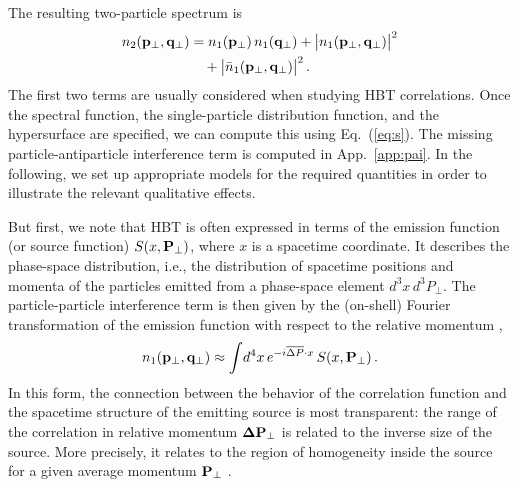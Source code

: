 \documentclass[reprint,superscriptaddress,english,preprintnumbers,amsmath,amssymb,aps,prx]{revtex4-2}
\def\Eq#1{Eq.~(\ref{#1})}
\def\App#1{App.~\ref{#1}}
\begin{document}
The resulting two-particle spectrum is
\begin{align}\label{eq:c2}
\begin{split}
n_2(\bold{p}_\perp,\bold{q}_\perp)
&= n_1(\bold{p}_\perp)\,n_1(\bold{q}_\perp) + \big|n_1(\bold{p}_\perp,\bold{q}_\perp)\big|^2\\
&\quad+ \big|\bar n_1(\bold{p}_\perp,\bold{q}_\perp)\big|^2\,.
\end{split}
\end{align}
The first two terms are usually considered when studying HBT correlations. Once the spectral function, the single-particle distribution function, and the hypersurface are specified, we can compute this using \Eq{eq:s}. The missing particle-antiparticle interference term is computed in \App{app:pai}. In the following, we set up appropriate models for the required quantities in order to illustrate the relevant qualitative effects.

But first, we note that HBT is often expressed in terms of the emission function (or source function) $S(x,\bold{P}_\perp)$, where $x$ is a spacetime coordinate. It describes the phase-space distribution, i.e., the distribution of spacetime positions and momenta of the particles emitted from a phase-space element $d^3x\,d^3P_\perp$. The particle-particle interference term is then given by the (on-shell) Fourier transformation of the emission function with respect to the relative momentum \cite{Heinz:1996bs,Wiedemann:1999qn},
\begin{align}\label{eq:emf}
n_1(\bold{p}_\perp,\bold{q}_\perp) \approx \int\! d^4x\,e^{-i \overline{\Delta P}\cdot x}\, S(x,\bold{P}_\perp)\,.
\end{align}
In this form, the connection between the behavior of the correlation function and the spacetime structure of the emitting source is most transparent: the range of the correlation in relative momentum $\bold{\Delta P}_\perp$ is related to the inverse size of the source. More precisely, it relates to the region of homogeneity inside the source for a given average momentum $\bold{P}_\perp$ \cite{Makhlin:1987gm}. 
\end{document}
